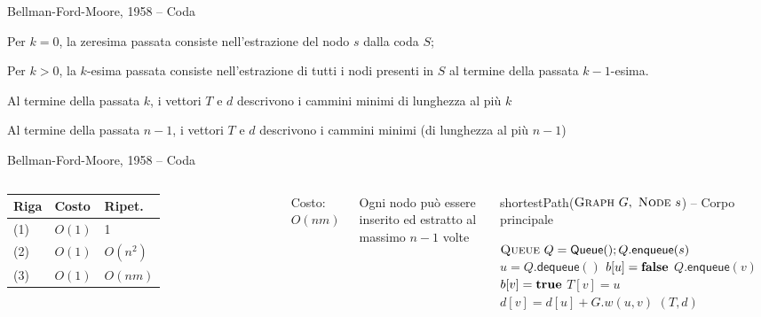 \begin{frame}{Bellman-Ford-Moore, 1958 -- Coda}

\vspace{-9pt}
\begin{myboxtitle}
\BIL
\item Per $k=0$, la zeresima passata consiste nell'estrazione del nodo $s$ dalla coda $S$;
\item Per $k>0$, la $k$-esima passata consiste nell'estrazione di tutti i nodi 
presenti in $S$ al termine della passata $k-1$-esima.
\EIL
\end{myboxtitle}

\begin{myboxtitle}
\BIL
\item Al termine della passata $k$, i vettori $T$ e $d$ descrivono i cammini minimi di
lunghezza al più $k$ 
\item Al termine della passata $n-1$, i vettori $T$ e $d$ descrivono i cammini minimi
(di lunghezza al più $n-1$)
\EIL
\end{myboxtitle}

\end{frame}

\begin{frame}{Bellman-Ford-Moore, 1958 -- Coda}


\vspace{-9pt}

\begin{columns}

\begingroup
\renewcommand*{\arraystretch}{1.2}
\begin{tabular}{|l|l|l|}
\hline
Riga & Costo & Ripet. \\\hline
(1) & $O(1)$ & 1 \\\hline
(2) & $O(1)$ & $O(n^2)$ \\\hline
(3) & $O(1)$ & $O(nm)$ \\\hline
\end{tabular}
\endgroup

\medskip
Costo: \alert{$O(nm)$}

\medskip
Ogni nodo può essere inserito ed estratto al massimo $n-1$ volte

\vspace{-12pt}
\footnotesize
\begin{Procedure}
\caption[A]{\footnotesize \textsf{shortestPath}($\textsc{Graph}\ G,\ \textsc{Node}\ s$) -- Corpo principale}
\alert{$\textsc{Queue}\ Q = \textsf{Queue}(); Q.\textsf{enqueue}(s)$}\;
{
  \alert{$u = Q.\textsf{dequeue}()$}\;
  $b[u] = \FALSE$\;
  {
    {
      {
        \alert{$Q.\textsf{enqueue}(v)$}\;
        $b[v] = \TRUE$\;
      }
      $T[v] = u$\;
      $d[v] = d[u] + G.w(u,v)$\;
    }
  }
}
\Return $(T,d)$
\end{Procedure}
\end{columns}

\end{frame}


